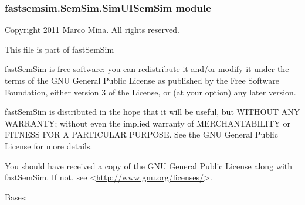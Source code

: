 \documentclass[letterpaper,10pt,english]{sphinxmanual}
\begin{document}
\subsubsection{fastsemsim.SemSim.SimUISemSim module}
\label{fastsemsim.SemSim:module-fastsemsim.SemSim.SimUISemSim}\label{fastsemsim.SemSim:fastsemsim-semsim-simuisemsim-module}
Copyright 2011 Marco Mina. All rights reserved.

This file is part of fastSemSim

fastSemSim is free software: you can redistribute it and/or modify
it under the terms of the GNU General Public License as published by
the Free Software Foundation, either version 3 of the License, or
(at your option) any later version.

fastSemSim is distributed in the hope that it will be useful,
but WITHOUT ANY WARRANTY; without even the implied warranty of
MERCHANTABILITY or FITNESS FOR A PARTICULAR PURPOSE.  See the
GNU General Public License for more details.

You should have received a copy of the GNU General Public License
along with fastSemSim.  If not, see \textless{}\href{http://www.gnu.org/licenses/}{http://www.gnu.org/licenses/}\textgreater{}.

\begin{fulllineitems}
\label{fastsemsim.SemSim:fastsemsim.SemSim.SimUISemSim.SimUISemSim}
Bases: {\hyperref[fastsemsim.SemSim:fastsemsim.SemSim.TermSemSim.TermSemSim]{}}

\begin{fulllineitems}
\label{fastsemsim.SemSim:fastsemsim.SemSim.SimUISemSim.SimUISemSim.IC_based}
\end{fulllineitems}


\begin{fulllineitems}
\label{fastsemsim.SemSim:fastsemsim.SemSim.SimUISemSim.SimUISemSim.SS_type}
\end{fulllineitems}


\end{fulllineitems}
\end{document}
